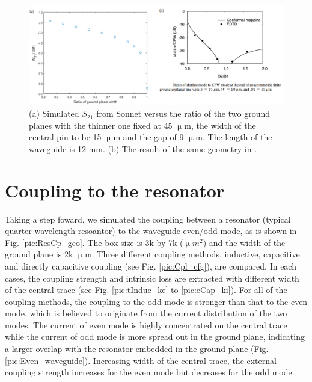 \documentclass[noshowpacs,amsmath,
superscriptaddress,
10pt]{article}
\begin{document}
\begin{figure}[!ht]
\centering
\includegraphics[width=16cm] {S_ratioPlaneWidth_c}
\caption{(a) Simulated $S_{21}$ from Sonnet versus the ratio of the two ground planes with the thinner one fixed at 45 $\upmu$m, the width of the central pin to be 15 $\upmu$m and the gap of 9 $\upmu$m. The length of the waveguide is 12 mm. (b) The result of the same geometry in \cite{ponchak2005excitation}.}
\label{pic:S_ratioPlaneWidth}
\end{figure}


\section{Coupling to the resonator}

Taking a step foward, we simulated the coupling between a resonator (typical quarter wavelength resoantor) to the waveguide even/odd mode, as is shown in Fig. \ref{pic:ResCp_geo}. The box size is 3k by 7k ($\upmu m^2$) and the width of the ground plane is 2k $\upmu$m. Three different coupling methods, inductive, capacitive and directly capacitive coupling (see Fig. \ref{pic:Cpl_cfg}), are compared. In each cases, the coupling strength and intrinsic loss are extracted with different width of the central trace (see Fig. \ref{pic:tInduc_ke} to \ref{pic:eCap_ki}). For all of the coupling methods, the coupling to the odd mode is stronger than that to the even mode, which is believed to originate from the current distribution of the two modes. The current of even mode is highly concentrated on the central trace while the current of odd mode is more spread out in the ground plane, indicating a larger overlap with the resonator embedded in the ground plane (Fig. \ref{pic:Even_waveguide}). Increasing width of the central trace, the external coupling strength increases for the even mode but decreases for the odd mode. 
\end{document}
